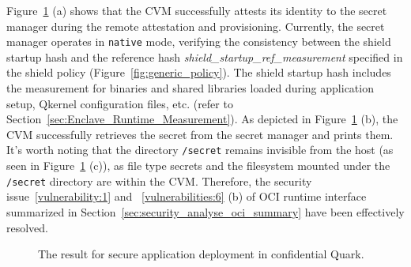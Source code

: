 Figure~\ref{fig:analysis_Secure_Application_Deployment} (a) shows that the \acrshort{CVM} successfully attests its identity to the secret manager during the remote attestation and provisioning. Currently, the secret manager operates in \texttt{native} mode, verifying the consistency 
between the shield startup hash and the reference hash \emph{shield\_startup\_ref\_measurement} specified in the shield policy (Figure~\ref{fig:generic_policy}). The shield startup hash includes the measurement for binaries and shared libraries loaded during application setup, 
Qkernel configuration files, etc. (refer to Section~\ref{sec:Enclave_Runtime_Measurement}). As depicted in Figure~\ref{fig:analysis_Secure_Application_Deployment} (b), the \acrshort{CVM} successfully retrieves the secret from the secret manager and prints them. 
It's worth noting that the directory \texttt{/secret} remains invisible from the host (as seen in Figure~\ref{fig:analysis_Secure_Application_Deployment} (c)), as file type secrets and the filesystem mounted under the \texttt{/secret} directory are within the \acrshort{CVM}. 
Therefore, the security issue~\ref{vulnerability:1} and ~\ref{vulnerabilities:6} (b) of OCI runtime interface~\cite*{oci-runtime-spec} summarized in Section~\ref{sec:security_analyse_oci_summary} have been effectively resolved.


\begin{figure}[!htb]

    
    
    \caption[The result for secure application deployment in confidential Quark]{The result for secure application deployment in confidential Quark.\label{fig:cquark_deployment}}
    \label{fig:analysis_Secure_Application_Deployment}
\end{figure}


